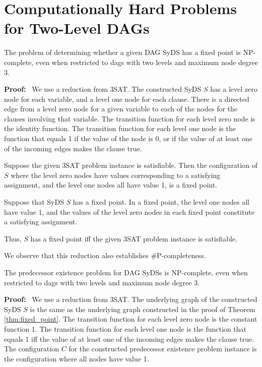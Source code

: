 \section{Computationally Hard Problems for  Two-Level DAGs}
\label{sec:two-levels}


\begin{theorem}\label{thm:fixed_point}
The problem of determining whether a given DAG SyDS has a fixed point is NP-complete,
even when restricted to dags with two levels and maximum node degree 3.
\end{theorem}

\noindent
\textbf{Proof:}~ 
We use a reduction from 3SAT.
The constructed SyDS $S$ has a level zero node for each variable, 
and a level one node for each clause.
There is a directed edge from a  level zero node for a given variable 
to each of  the nodes for the clauses involving that variable.
The transition function for each level zero node is the identity function.
The transition function for each level one node is the function that equals 1
if the value of the node is 0, or if the value of at least one of the incoming edges
makes the clause true. 

\smallskip
Suppose the given 3SAT problem instance is satisfiable.
Then the configuration of $S$ where the level zero nodes 
have values corresponding to a satisfying assignment,
and the level one nodes all have value 1,
is a fixed point.

\smallskip

Suppose that SyDS $S$ has a fixed point.
In a fixed point, the level one nodes all have value 1,
and the values of the level zero nodes in each fixed point constitute a satisfying assignment.

\smallskip
Thus, $S$ has a fixed point iff the given 3SAT problem instance is satisfiable.

\smallskip
We observe that this reduction also establishes \#P-completeness.
\QED

\smallskip

\begin{theorem}\label{thm:predecessor_existence}
The predecessor existence problem for DAG SyDSs  is NP-complete,
even when restricted to dags with two levels and maximum node degree 3.
\end{theorem}

\noindent
\textbf{Proof:}~ 
We use a reduction from 3SAT.
The underlying graph of the constructed SyDS $S$ is the same as the underlying graph constructed 
in the proof of Theorem \ref{thm:fixed_point}.
The transition function for each level zero node is the constant function 1.
The transition function for each level one node is the function that equals 1
iff  the value of at least one of the incoming edges
makes the clause true. 
The configuration $C$ for the constructed predecessor existence problem instance 
is the configuration where all nodes have value 1.

